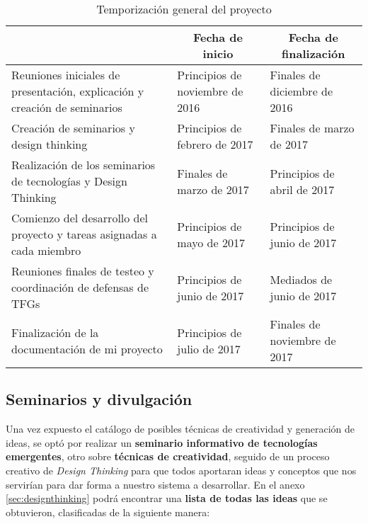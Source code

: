 \begin{table}
    \begin{center}
        \begin{tabular}{|p{5cm}|p{3cm}|p{3cm}|}
            \hline
                \rowcolor{Gray}\multicolumn{1}{|c|}{\textbf{Hito o tarea}}
                & \multicolumn{1}{|c|}{\textbf{Fecha de inicio}}
                & \multicolumn{1}{|c|}{\textbf{Fecha de finalización}}\\
            \hline
                Reuniones iniciales de presentación, explicación y creación de seminarios & Principios de noviembre de 2016 & Finales de diciembre de 2016 \\
            \hline
                Creación de seminarios y design thinking & Principios de febrero de 2017 & Finales de marzo de 2017\\
            \hline
                Realización de los seminarios de tecnologías y Design Thinking & Finales de marzo de 2017 & Principios de abril de 2017 \\
            \hline
                Comienzo del desarrollo del proyecto y tareas asignadas a cada miembro & Principios de mayo de 2017 & Principios de junio de 2017 \\
            \hline
                Reuniones finales de testeo y coordinación de defensas de TFGs & Principios de junio de 2017 & Mediados de junio de 2017 \\
            \hline
                Finalización de la documentación de mi proyecto & Principios de julio de 2017 & Finales de noviembre de 2017 \\
            \hline
        \end{tabular}
        \caption{Temporización general del proyecto}
        \label{temporizacion}
    \end{center}
\end{table}

\subsection{Seminarios y divulgación}
Una vez expuesto el catálogo de posibles técnicas de creatividad y generación de ideas, se optó por realizar un \textbf{seminario informativo de tecnologías emergentes}, otro sobre \textbf{técnicas de creatividad}, seguido de un proceso creativo de \textit{Design Thinking} para que todos aportaran ideas y conceptos que nos servirían para dar forma a nuestro sistema a desarrollar. En el anexo \ref{sec:designthinking} podrá encontrar una \textbf{lista de todas las ideas} que se obtuvieron, clasificadas de la siguiente manera:


